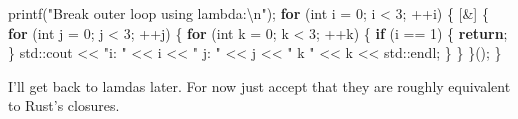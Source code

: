 \documentclass[
]{book}
\newenvironment{Shaded}{\begin{snugshade}}{\end{snugshade}}
\newcommand{\BuiltInTok}[1]{#1}
\newcommand{\ControlFlowTok}[1]{\textcolor[rgb]{0.13,0.29,0.53}{\textbf{#1}}}
\newcommand{\DataTypeTok}[1]{\textcolor[rgb]{0.13,0.29,0.53}{#1}}
\newcommand{\DecValTok}[1]{\textcolor[rgb]{0.00,0.00,0.81}{#1}}
\newcommand{\NormalTok}[1]{#1}
\newcommand{\SpecialCharTok}[1]{\textcolor[rgb]{0.00,0.00,0.00}{#1}}
\newcommand{\StringTok}[1]{\textcolor[rgb]{0.31,0.60,0.02}{#1}}
\begin{document}
\begin{Shaded}
\begin{Highlighting}[]
\NormalTok{printf(}\StringTok{"Break outer loop using lambda:}\SpecialCharTok{\textbackslash{}n}\StringTok{"}\NormalTok{);}
\ControlFlowTok{for}\NormalTok{ (}\DataTypeTok{int}\NormalTok{ i = }\DecValTok{0}\NormalTok{; i \textless{} }\DecValTok{3}\NormalTok{; ++i)}
\NormalTok{\{}
\NormalTok{    [\&] \{}
        \ControlFlowTok{for}\NormalTok{ (}\DataTypeTok{int}\NormalTok{ j = }\DecValTok{0}\NormalTok{; j \textless{} }\DecValTok{3}\NormalTok{; ++j)}
\NormalTok{        \{}
            \ControlFlowTok{for}\NormalTok{ (}\DataTypeTok{int}\NormalTok{ k = }\DecValTok{0}\NormalTok{; k \textless{} }\DecValTok{3}\NormalTok{; ++k)}
\NormalTok{            \{}
                \ControlFlowTok{if}\NormalTok{ (i == }\DecValTok{1}\NormalTok{)}
\NormalTok{                \{}
                    \ControlFlowTok{return}\NormalTok{;}
\NormalTok{                \}}
                \BuiltInTok{std::}\NormalTok{cout \textless{}\textless{} }\StringTok{"i: "}\NormalTok{ \textless{}\textless{} i \textless{}\textless{} }\StringTok{" j: "}\NormalTok{ \textless{}\textless{} j \textless{}\textless{} }\StringTok{" k "}\NormalTok{ \textless{}\textless{} k \textless{}\textless{} }\BuiltInTok{std::}\NormalTok{endl;}
\NormalTok{            \}}
\NormalTok{        \}}
\NormalTok{    \}();}
\NormalTok{\}}
\end{Highlighting}
\end{Shaded}

I'll get back to lamdas later. For now just accept that they are roughly equivalent to Rust's closures.

  
\end{document}
